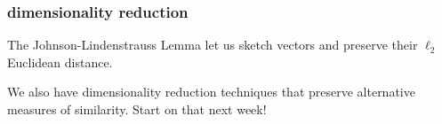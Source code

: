 \documentclass[compress]{beamer}
\newcommand{\bv}[1]{\mathbf{#1}}
\begin{document}
%
\begin{frame}
		\frametitle{dimensionality reduction}
		\begin{center}
	The Johnson-Lindenstrauss Lemma let us sketch vectors and preserve their $\ell_2$ Euclidean distance. 
	
	We also have dimensionality reduction techniques that preserve alternative measures of similarity. Start on that next week!
	\end{center}
\end{frame}
%
%
%		
%
%	
\end{document}
